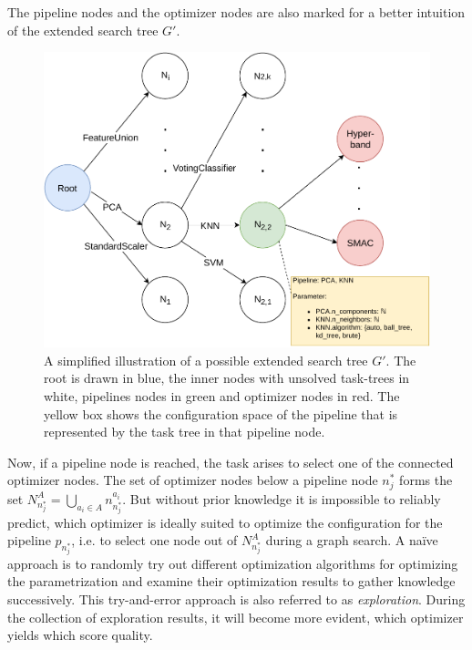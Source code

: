 The pipeline nodes and the optimizer nodes are also marked for a better intuition of the extended search tree $G'$.
\begin{figure}[ht!]
    \centering
    \includegraphics[width=\textwidth]{gfx/Figures/Approach/SearchGraph.pdf}
    \caption[A simplified illustration of a possible extended search tree $G'$.]{A simplified illustration of a possible extended search tree $G'$. The root is drawn in blue, the inner nodes with unsolved task-trees in white, pipelines nodes in green and optimizer nodes in red.
    The yellow box shows the configuration space of the pipeline that is represented by the task tree in that pipeline node.}
    \label{fig:approach:search-graph}
\end{figure}

Now, if a pipeline node is reached, the task arises to select one of the connected optimizer nodes.
The set of optimizer nodes below a pipeline node $n^*_j$ forms the set $N^A_{n^*_j} = \bigcup_{a_i \in A} n^{a_i}_{n^*_j}$.
But without prior knowledge it is impossible to reliably predict, which optimizer is ideally suited to optimize the configuration for the pipeline $p_{n^*_j}$, i.e. to select one node out of $N^A_{n^*_j}$ during a graph search.\newline
A na\"ive approach is to randomly try out different optimization algorithms for optimizing the parametrization and examine their optimization results to gather knowledge successively.
This try-and-error approach is also referred to as \textit{exploration}.
During the collection of exploration results, it will become more evident, which optimizer yields which score quality.

